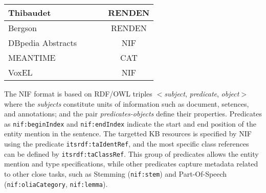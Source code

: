 \documentclass[sigconf]{acmart}
\newcommand{\cmark}{\ding{51}}%
\newcommand{\xmark}{\ding{55}}%
\begin{document}
\begin{table}[tb!]
\begin{tabular}{lccc}
Thibaudet~\cite{renden2016}         &\xmark &\cmark & RENDEN  \\\midrule%
Bergson~\cite{renden2016}           &\xmark &\cmark & RENDEN  \\\midrule%
DBpedia Abstracts
~\cite{abstracts2016}               &\xmark &\xmark & NIF \\\midrule%
MEANTIME~\cite{meantime2016}        &\cmark &\cmark & CAT \\\midrule%
VoxEL~\cite{VoxEL2018}              &\cmark &\xmark & NIF \\%
\bottomrule
\end{tabular}
\end{table}

The NIF format is based on RDF/OWL triples $<$\textit{subject}, \textit{predicate}, \textit{object}$>$ where the \textit{subjects} constitute units of information such as document, setences, and annotations; and the pair \textit{predicates-objects} define their properties. Predicates as \texttt{nif:beginIndex} and \texttt{nif:endIndex} indicate the start and end position of the entity mention in the sentence. The targetted KB resources is specified by NIF using the predicate \texttt{itsrdf:taIdentRef}, and the most specific class references can be defined by \texttt{itsrdf:taClassRef}. This group of predicates allows the entity mention and type specifications, while other predicates capture metadata related to other close tasks, such as Stemming (\texttt{nif:stem}) and Part-Of-Speech (\texttt{nif:oliaCategory}, \texttt{nif:lemma}).  








\end{document}
